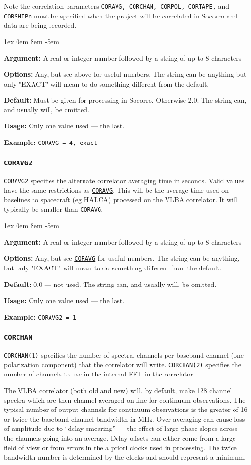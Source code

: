 \documentclass{report}
\newcommand{\rcwbox}[5]{
  \begin{list}{}{\parsep 1ex  \itemsep 0em
                 \leftmargin 8em  \itemindent -5em }
    \item {\bf Argument:} #1
    \item {\bf Options:}  #2
    \item {\bf Default:}  #3
    \item {\bf Usage:}    #4
    \item {\bf Example:}  #5
  \end{list}
}
\begin{document}
Note the correlation parameters {\tt CORAVG, CORCHAN,
CORPOL, CORTAPE,} and {\tt CORSHIPn} must be specified when
the project will be correlated in Socorro and data
are being recorded.

\rcwbox
{A real or integer number followed by a string of up to 8 characters}
{Any, but see above for useful numbers. The string can be anything but
only "EXACT" will mean to do something different from the default.}
{Must be given for processing in Socorro.  Otherwise 2.0.  The string
can, and usually will, be omitted.}
{Only one value used --- the last.}
{{\tt CORAVG = 4, exact}}

\subsubsection{\label{MP:CORAVG2}{\tt CORAVG2}}

{\tt CORAVG2} specifies the alternate correlator averaging time in
seconds.  Valid values have the same restrictions as 
{\hyperref[MP:CORAVG]{{\tt CORAVG}}}.
This will be the average time used
on baselines to spacecraft (eg HALCA) processed on the VLBA correlator.
It will typically be smaller than {\tt CORAVG}.

\rcwbox
{A real or integer number followed by a string of up to 8 characters}
{Any, but see 
{\hyperref[MP:CORAVG]{{\tt CORAVG}}}
for useful numbers. The string can be anything, but
only "EXACT" will mean to do something different from the default.}
{0.0 --- not used.  The string can, and usually will, be omitted.}
{Only one value used --- the last.}
{{\tt CORAVG2 = 1}}

\subsubsection{\label{MP:CORCHAN}{\tt CORCHAN}}

{\tt CORCHAN(1)} specifies the number of spectral channels per baseband
channel (one polarization component) that the correlator will write.
{\tt CORCHAN(2)} specifies the number of channels to use in the internal
FFT in the correlator.

The VLBA correlator (both old and new) will, by default, make 128
channel spectra which are then channel averaged on-line for continuum
observations.  The typical number of output channels for continuum
observations is the greater of 16 or twice the baseband channel
bandwidth in MHz.  Over averaging can cause loss of amplitude due to
``delay smearing'' --- the effect of large phase slopes across the
channels going into an average.  Delay offsets can either come from a
large field of view or from errors in the a priori clocks used in
processing.  The twice bandwidth number is determined by the clocks
and should represent a minimum.
\end{document}
